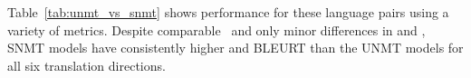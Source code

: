  Table~\ref{tab:unmt_vs_snmt} shows performance for these language pairs using a variety of metrics. Despite comparable \bleu\ and only minor differences in  and , SNMT models have consistently higher  and BLEURT than the UNMT models for all six translation directions. 
 




